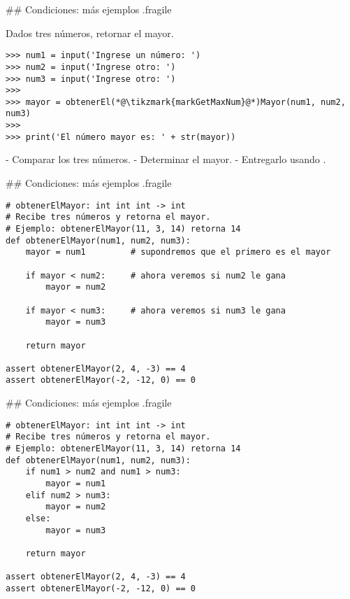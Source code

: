\trmcolumns

## Condiciones: más ejemplos {.fragile}

\bgnblockgood
Dados \alert{tres} números, \alert{retornar} el mayor.
\trmblockgood

\begin{lstlisting}
>>> num1 = input('Ingrese un número: ')
>>> num2 = input('Ingrese otro: ')
>>> num3 = input('Ingrese otro: ')
>>> 
>>> mayor = obtenerEl(*@\tikzmark{markGetMaxNum}@*)Mayor(num1, num2, num3)
>>> 
>>> print('El número mayor es: ' + str(mayor))
\end{lstlisting}

\pause

\vspace{-3ex}

\bgncolumns


\footnotesize

- Comparar los tres números.
- Determinar el mayor.
- Entregarlo usando .

\trmcolumns

## Condiciones: más ejemplos {.fragile}


\begin{lstlisting}[style=frame02]
# obtenerElMayor: int int int -> int
# Recibe tres números y retorna el mayor.
# Ejemplo: obtenerElMayor(11, 3, 14) retorna 14
def obtenerElMayor(num1, num2, num3):
    mayor = num1         # supondremos que el primero es el mayor

    if mayor < num2:     # ahora veremos si num2 le gana
        mayor = num2

    if mayor < num3:     # ahora veremos si num3 le gana
        mayor = num3

    return mayor

assert obtenerElMayor(2, 4, -3) == 4
assert obtenerElMayor(-2, -12, 0) == 0
\end{lstlisting}

## Condiciones: más ejemplos {.fragile}


\begin{lstlisting}[style=frame02]
# obtenerElMayor: int int int -> int
# Recibe tres números y retorna el mayor.
# Ejemplo: obtenerElMayor(11, 3, 14) retorna 14
def obtenerElMayor(num1, num2, num3):
    if num1 > num2 and num1 > num3:
        mayor = num1
    elif num2 > num3:
        mayor = num2
    else:
        mayor = num3

    return mayor

assert obtenerElMayor(2, 4, -3) == 4
assert obtenerElMayor(-2, -12, 0) == 0
\end{lstlisting}


